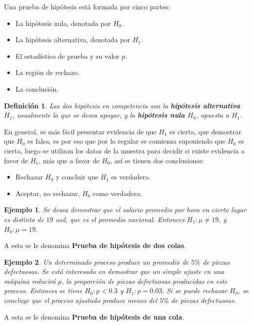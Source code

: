 \documentclass[a4paper]{report} %
\newtheorem{Def}{Definici\'on}[chapter]
\newtheorem{Ejem}{Ejemplo}[chapter]
\begin{document}
Una prueba de hip\'otesis est\'a formada por cinco partes:
\begin{itemize}
    \item La hip\'otesis nula, denotada por $H_{0}$.
    \item La hip\'otesis alternativa, denotada por $H_{1}$.
    \item El estad\'istico de prueba y su valor $p$.
    \item La regi\'on de rechazo.
    \item La conclusi\'on.
\end{itemize}

\begin{Def}
Las dos hip\'otesis en competencia son la \textbf{hip\'otesis alternativa $H_{1}$}, usualmente la que se desea apoyar, y la \textbf{hip\'otesis nula $H_{0}$}, opuesta a $H_{1}$.
\end{Def}
En general, es m\'as f\'acil presentar evidencia de que $H_{1}$ es cierta, que demostrar que $H_{0}$ es falsa, es por eso que por lo regular se comienza suponiendo que $H_{0}$ es cierta, luego se utilizan los datos de la muestra para decidir si existe evidencia a favor de $H_{1}$, m\'as que a favor de $H_{0}$, as\'i se tienen dos conclusiones:
\begin{itemize}
    \item Rechazar $H_{0}$ y concluir que $H_{1}$ es verdadera.
    \item Aceptar, no rechazar, $H_{0}$ como verdadera.
\end{itemize}

\begin{Ejem}
Se desea demostrar que el salario promedio por hora en cierto lugar es distinto de $19$ usd, que es el promedio nacional. Entonces $H_{1}:\mu \neq 19$, y $H_{0}:\mu = 19$.
\end{Ejem}
A esta se le denomina \textbf{Prueba de hip\'otesis de dos colas}.

\begin{Ejem}
Un determinado proceso produce un promedio de $5\%$ de piezas defectuosas. Se est\'a interesado en demostrar que un simple ajuste en una m\'aquina reducir\'a $p$, la proporci\'on de piezas defectuosas producidas en este proceso. Entonces se tiene $H_{0}: p < 0.3$ y $H_{1}: p = 0.03$. Si se puede rechazar $H_{0}$, se concluye que el proceso ajustado produce menos del $5\%$ de piezas defectuosas.
\end{Ejem}
A esta se le denomina \textbf{Prueba de hip\'otesis de una cola}.
\end{document}
